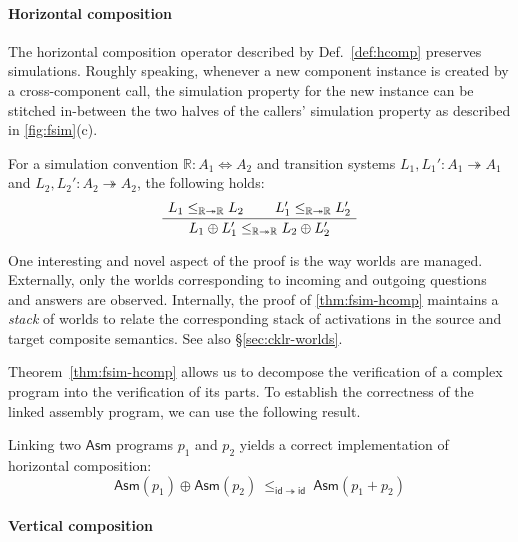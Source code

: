 \documentclass[sigplan,screen]{acmart}
\newcommand{\kw}[1]{\ensuremath{ \mathsf{#1} }}
\begin{document}

\paragraph{Horizontal composition} %

The horizontal composition operator
described by Def.~\ref{def:hcomp}
preserves simulations.
Roughly speaking,
whenever a new component instance is created
by a cross-component call,
the simulation property for the new instance
can be stitched in-between
the two halves of the callers' simulation property
as described in \autoref{fig:fsim}(c).

\begin{theorem} \label{thm:fsim-hcomp} %
For a simulation convention
$\mathbb{R} : A_1 \Leftrightarrow A_2$
and transition systems
$L_1, L_1' : A_1 \twoheadrightarrow A_1$ and
$L_2, L_2' : A_2 \twoheadrightarrow A_2$,
the following holds:
\[
    \AxiomC{$L_1 \le_{\mathbb{R} \twoheadrightarrow \mathbb{R}} L_2$}
    \AxiomC{$L_1' \le_{\mathbb{R} \twoheadrightarrow \mathbb{R}} L_2'$}
    \BinaryInfC{$L_1 \oplus L_1'
      \le_{\mathbb{R} \twoheadrightarrow \mathbb{R}}
      L_2 \oplus L_2'$}
    \DisplayProof
\]
\end{theorem}

One interesting and novel aspect of the proof
is the way worlds are managed.
Externally,
only the worlds corresponding to incoming and outgoing
questions and answers are observed.
Internally,
the proof of \autoref{thm:fsim-hcomp}
maintains a \emph{stack} of
worlds
to relate the corresponding stack of activations
in the source and target composite semantics.
See also \S\ref{sec:cklr-worlds}.

Theorem~\ref{thm:fsim-hcomp}
allows us to decompose the verification of a complex program
into the verification of its parts.
To establish the correctness of the linked assembly program,
we can use the following result.

\begin{theorem} \label{thm:asmlinking} %
Linking two \kw{Asm} programs $p_1$ and $p_2$
yields a correct implementation of
horizontal composition:
\[
      \kw{Asm}(p_1) \oplus \kw{Asm}(p_2)
      \:\le_{\kw{id} \twoheadrightarrow \kw{id}}\:
      \kw{Asm}(p_1 + p_2)
\]
\end{theorem}


\paragraph{Vertical composition} %
\end{document}
